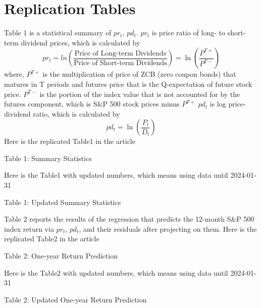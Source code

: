 \documentclass{article}
\begin{document}
\section{Replication Tables}
Table 1 is a statistical summary of \( pr_t \), \( pd_t \). \( pr_t \) 
is price ratio of long- to short-term dividend prices, which is calculated by 
\begin{equation}
pr_t = ln \left( \frac{\text{Price of Long-term Dividends}}{\text{Price of Short-term Dividends}} \right) = \ln \left( \frac{P^{T+}}{P^{T-}} \right)
\end{equation}
where, \(P^{T+}\) is the multiplication of price of ZCB (zero coupon bonds) 
that matures in T periods and futures price that is the Q-expectation of 
future stock price. \(P^{T-}\) is the portion of the index value that is not 
accounted for by the futures component, which is S\&P 500 stock prices minus \(P^{T+}\)
\newline
\newline
\( pd_t \) is log price-dividend ratio, which is calculated by 
\begin{equation}
pd_t = \ln \left(\frac{P_t}{D_t} \right)
\end{equation}
Here is the replicated Table1 in the article
\begin{table}[H]
\centering

\caption*{Table 1: Summary Statistics}
\label{tab:your_label}
\end{table}

Here is the Table1 with updated numbers, which means using data until 2024-01-31
\begin{table}[H]
\centering

\caption*{Table 1: Updated Summary Statistics}
\label{tab:your_label}
\end{table}

Table 2 reports the results of the regression that predicts 
the 12-month S\&P 500 index return via \( pr_t \), \( pd_t \), and their 
residuals after projecting on them. 
\newline
\newline
Here is the replicated Table2 in the article
\begin{table}[H]
\centering

\caption*{Table 2: One-year Return Prediction}
\label{tab:your_label}
\end{table}    

Here is the Table2 with updated numbers, which means using data until 2024-01-31
\begin{table}[H]
    \centering
    
    \caption*{Table 2: Updated One-year Return Prediction}
    \label{tab:your_label}
    \end{table}   
\end{document}
